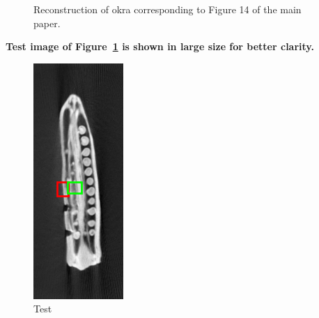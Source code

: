 \documentclass{article}
\begin{document}
\begin{figure}[!h]
\caption{Reconstruction of okra corresponding to Figure 14 of the main paper.}
\label{fig:okra_3D_results_biggerIm}
\end{figure}
\newpage
\textbf{Test image of Figure~\ref{fig:okra_3D_results_biggerIm}   is shown in large size for better clarity.}
\begin{figure}[!h]
\centering
       \includegraphics[width=0.5\columnwidth]{../images/okra/testCropped.png}
\captionsetup{labelformat=empty}
        \caption{\large{Test}}
\end{figure}
\newpage
\end{document}

